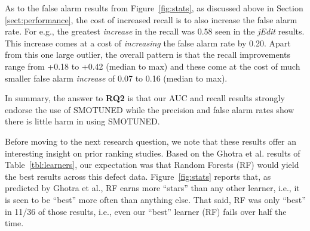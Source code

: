 \documentclass[sigconf]{acmart}
\theoremstyle{break}
\newcommand{\tion}[1]{{Section }\ref{sect:#1}}
\newcommand{\smb}{{\sc SMOTUNED}}
\begin{document}
As to the false alarm results from Figure~\ref{fig:stats}, as discussed above in \tion{performance}, the cost of increased recall is to also increase
the false alarm rate. For e.g., the greatest \textit{increase} in the recall was 0.58 seen in the {\em jEdit} results. This increase comes at a cost
of \textit{increasing} the false alarm rate by 0.20. Apart from this one large outlier, the overall pattern is that the recall improvements range from +0.18 to +0.42 (median to max)
and these come at the cost of much smaller false alarm \textit{increase} of 0.07 to 0.16 (median to max). 
 
In summary, the answer to {\bf RQ2} is that our  AUC and recall results strongly endorse the  use of {\smb}
while the precision and false alarm rates
show there is little harm in using {\smb}.

Before moving to the next research question, we note that these
 results offer an interesting insight on prior ranking studies.
Based on the Ghotra et al.
results of  Table~\ref{tbl:learners}, our expectation was that Random Forests (RF)
would yield the best results across this defect data. Figure~\ref{fig:stats} reports
that, as predicted by Ghotra et al., RF earns more ``stars'' than any other learner, i.e., it is seen to be ``best'' more often than anything else. That said,  
RF was only ``best'' 
in   11/36 of those results, i.e., even our ``best'' learner (RF) fails over half the time.
\end{document}
